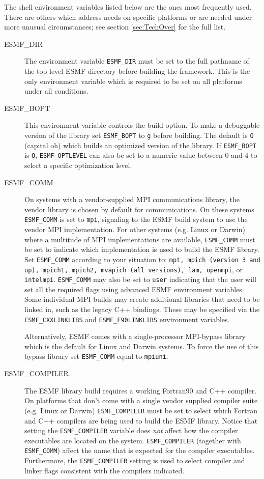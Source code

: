 The shell environment variables listed below are the ones most
frequently used.  There are others which address needs on specific
platforms or are needed under more unusual circumstances;
see section \ref{sec:TechOver} for the full list.
\begin{description}

\item[ESMF\_DIR]
The environment variable {\tt ESMF\_DIR} must be set to the full pathname 
of the top level ESMF directory before building the framework.  This is the 
only environment variable which is required to be set on all platforms under 
all conditions.

\item[ESMF\_BOPT]
This environment variable controls the build option. To make a debuggable
version of the library set {\tt ESMF\_BOPT} to {\tt g} before building. The
default is {\tt O} (capital oh) which builds an optimized version of the 
library. If {\tt ESMF\_BOPT} is {\tt O}, {\tt ESMF\_OPTLEVEL} can also be set
to a numeric value between 0 and 4 to select a specific optimization level.

\item[ESMF\_COMM]
On systems with a vendor-supplied MPI communications library, the vendor library 
is chosen by default for communications. On these systems {\tt ESMF\_COMM} is
set to {\tt mpi}, signaling to the ESMF build system to use the vendor MPI
implementation.
For other systems (e.g. Linux or Darwin) where a multitude of MPI
implementations are available, {\tt ESMF\_COMM} must be set to indicate which
implementation is used to build the ESMF library. Set {\tt ESMF\_COMM} according
to your situation to: {\tt mpt, mpich (version 3 and up), mpich1, mpich2,
mvapich (all versions), lam, openmpi}, or {\tt intelmpi}.
{\tt ESMF\_COMM} may also be set to {\tt user} indicating
that the user will set all the required flags using advanced ESMF environment
variables.  Some individual MPI builds may create additional libraries that 
need to be linked in, such as the legacy C++ bindings. These may be specified 
via the {\tt ESMF\_CXXLINKLIBS} and {\tt ESMF\_F90LINKLIBS} environment
variables.

Alternatively, ESMF comes with a single-processor MPI-bypass library which is
the default for Linux and Darwin systems. To force the use of this bypass
library set {\tt ESMF\_COMM} equal to {\tt mpiuni}.

\item[ESMF\_COMPILER]
The ESMF library build requires a working Fortran90 and C++ compiler. On 
platforms that don't come with a single vendor supplied compiler suite
(e.g. Linux or Darwin) {\tt ESMF\_COMPILER} must be set to select which Fortran
and C++ compilers are being used to build the ESMF library. Notice that setting
the {\tt ESMF\_COMPILER} variable does {\em not} affect how the compiler
executables are located on the system. {\tt ESMF\_COMPILER} (together with
{\tt ESMF\_COMM}) affect the name that is expected for the compiler executables.
Furthermore, the {\tt ESMF\_COMPILER} setting is used to select compiler and
linker flags consistent with the compilers indicated.


\end{description}
